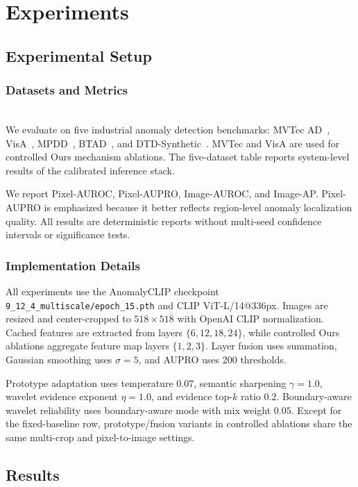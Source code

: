 \documentclass[runningheads]{llncs}
\begin{document}
\section{Experiments}

\subsection{Experimental Setup}

\subsubsection{Datasets and Metrics}
\mbox{}\\
\noindent
We evaluate on five industrial anomaly detection benchmarks: MVTec AD~\cite{bergmann2019mvtec,bergmann2021mvtec}, VisA~\cite{zou2022visa}, MPDD~\cite{jezek2021deep}, BTAD~\cite{mishra2021vt}, and DTD-Synthetic~\cite{aota2023zero}. MVTec and VisA are used for controlled Ours mechanism ablations. The five-dataset table reports system-level results of the calibrated inference stack.

We report Pixel-AUROC, Pixel-AUPRO, Image-AUROC, and Image-AP. Pixel-AUPRO is emphasized because it better reflects region-level anomaly localization quality. All results are deterministic reports without multi-seed confidence intervals or significance tests.

\subsubsection{Implementation Details}
All experiments use the AnomalyCLIP checkpoint \texttt{9\_12\_4\_multiscale/epoch\_15.pth} and CLIP ViT-L/14@336px. Images are resized and center-cropped to $518\times518$ with OpenAI CLIP normalization. Cached features are extracted from layers $\{6,12,18,24\}$, while controlled Ours ablations aggregate feature map layers $\{1,2,3\}$. Layer fusion uses summation, Gaussian smoothing uses $\sigma=5$, and AUPRO uses 200 thresholds.

Prototype adaptation uses temperature $0.07$, semantic sharpening $\gamma=1.0$, wavelet evidence exponent $\eta=1.0$, and evidence top-$k$ ratio $0.2$. Boundary-aware wavelet reliability uses boundary-aware mode with mix weight $0.05$. Except for the fixed-baseline row, prototype/fusion variants in controlled ablations share the same multi-crop and pixel-to-image settings.

\subsection{Results}
\end{document}
